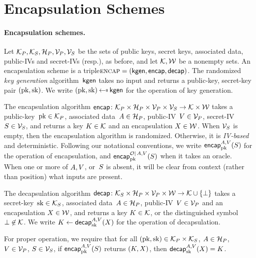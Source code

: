 \section{Encapsulation Schemes}
\label{sec:kem}

\paragraph{Encapsulation schemes. } 
Let $\pubkeys, \seckeys, \adata, \pubivs, \secivs$ be the sets of public keys, secret keys, associated data, public-IVs and secret-IVs (resp.), as before, and let $\keys,\wraps$ be a nonempty sets.
%
An encapsulation scheme is a triple$\encapscheme=(\pkgen,\encap,\decap)$.   The randomized \emph{key generation} algorithm~$\pkgen$ takes no input and returns a public-key, secret-key pair $(\pk,\sk)$.  We write $(\pk,\sk)\getsr\pkgen$ for the operation of key generation. 

The encapsulation algorithm $\encap \colon \pubkeys \times \adata \times \pubivs \times \secivs \to \keys \times \wraps$ takes a public-key~$\pk\in\pubkeys$, associated data~$\header \in \adata$, public-IV~$\pubiv \in \pubivs$, secret-IV~$\seciv \in \secivs$, and returns a key $K \in \keys$ and an encapsulation $X \in \wraps$. 
When $\secivs$ is empty, then the encapsulation algorithm is randomized.  Otherwise, it is \emph{IV-based} and deterministic.  Following our notational conventions, we write $\encapprim{\pk}{\header,\pubiv}{\seciv}$ for the operation of encapsulation, and $\encapprimO{\pk}{\header,\pubiv}{\seciv}{\mathcal{O}}$ when it takes an oracle.  When one or more of $\header,\pubiv$, or~$\seciv$ is absent, it will be clear from context (rather than position) what inputs are present.

The decapsulation algorithm $\decap \colon \seckeys \times \adata \times \pubivs \times \wraps \to \keys \cup \{\bot\}$ takes a secret-key~$\sk\in\seckeys$, associated data~$\header \in \adata$, public-IV~$\pubiv \in \pubivs$ and an encapsulation $X \in \wraps$, and returns a key $K \in \keys$, or the distinguished symbol~$\bot \not\in \keys$.  We write $K \gets \decapprim{\sk}{\header,\pubiv}{\wrap}$ for the operation of decapsulation. 

For proper operation, we require that for all $(\pk,\sk)\in\pubkeys\times\seckeys$, $\header\in\adata$, $\pubiv\in\pubivs$, $\seciv\in\secivs$, if $\encapprim{\pk}{\header,\pubiv}{\seciv}$ returns $(K,\wrap)$, then $\decapprim{\sk}{\header,\pubiv}{\wrap}=K$.


